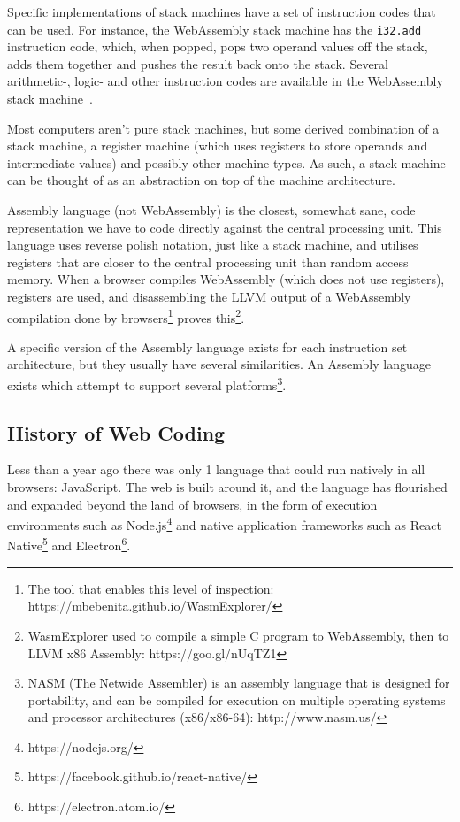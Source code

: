 \documentclass[a4paper]{article}
\begin{document}
Specific implementations of stack machines have a set of instruction codes that can be used. For instance, the WebAssembly stack machine has the \texttt{i32.add} instruction code, which, when popped, pops two operand values off the stack, adds them together and pushes the result back onto the stack. Several arithmetic-, logic- and other instruction codes are available in the WebAssembly stack machine~\cite{website:wasm-binary-encoding}.

Most computers aren't pure stack machines, but some derived combination of a stack machine, a register machine (which uses registers to store operands and intermediate values) and possibly other machine types. As such, a stack machine can be thought of as an abstraction on top of the machine architecture.

Assembly language (not WebAssembly) is the closest, somewhat sane, code representation we have to code directly against the central processing unit. This language uses reverse polish notation, just like a stack machine, and utilises registers that are closer to the central processing unit than random access memory. When a browser compiles WebAssembly (which does not use registers), registers are used, and disassembling the LLVM output of a WebAssembly compilation done by browsers\footnote{The tool that enables this level of inspection: https://mbebenita.github.io/WasmExplorer/} proves this\footnote{WasmExplorer used to compile a simple C program to WebAssembly, then to LLVM x86 Assembly: https://goo.gl/nUqTZ1}.

A specific version of the Assembly language exists for each instruction set architecture, but they usually have several similarities. An Assembly language exists which attempt to support several platforms\footnote{NASM (The Netwide Assembler) is an assembly language that is designed for portability, and can be compiled for execution on multiple operating systems and processor architectures (x86/x86-64): http://www.nasm.us/}.

\newpage
\subsection{History of Web Coding}
\label{sec:problem-analysis:history}
Less than a year ago there was only 1 language that could run natively in all browsers: JavaScript. The web is built around it, and the language has flourished and expanded beyond the land of browsers, in the form of execution environments such as Node.js\footnote{https://nodejs.org/} and native application frameworks such as React Native\footnote{https://facebook.github.io/react-native/} and Electron\footnote{https://electron.atom.io/}.
\end{document}
